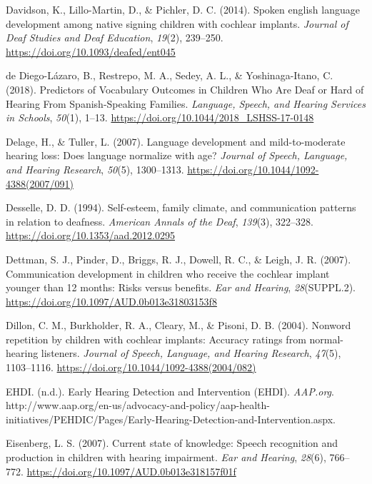 \documentclass[english,man]{apa6}
\begin{document}
\leavevmode\hypertarget{ref-davidson2014}{}%
Davidson, K., Lillo-Martin, D., \& Pichler, D. C. (2014). Spoken english language development among native signing children with cochlear implants. \emph{Journal of Deaf Studies and Deaf Education}, \emph{19}(2), 239--250. \url{https://doi.org/10.1093/deafed/ent045}

\leavevmode\hypertarget{ref-dediego-lazaro2018}{}%
de Diego-Lázaro, B., Restrepo, M. A., Sedey, A. L., \& Yoshinaga-Itano, C. (2018). Predictors of Vocabulary Outcomes in Children Who Are Deaf or Hard of Hearing From Spanish-Speaking Families. \emph{Language, Speech, and Hearing Services in Schools}, \emph{50}(1), 1--13. \url{https://doi.org/10.1044/2018_LSHSS-17-0148}

\leavevmode\hypertarget{ref-delage2007}{}%
Delage, H., \& Tuller, L. (2007). Language development and mild-to-moderate hearing loss: Does language normalize with age? \emph{Journal of Speech, Language, and Hearing Research}, \emph{50}(5), 1300--1313. \url{https://doi.org/10.1044/1092-4388(2007/091)}

\leavevmode\hypertarget{ref-desselle1994}{}%
Desselle, D. D. (1994). Self-esteem, family climate, and communication patterns in relation to deafness. \emph{American Annals of the Deaf}, \emph{139}(3), 322--328. \url{https://doi.org/10.1353/aad.2012.0295}

\leavevmode\hypertarget{ref-dettman2007}{}%
Dettman, S. J., Pinder, D., Briggs, R. J., Dowell, R. C., \& Leigh, J. R. (2007). Communication development in children who receive the cochlear implant younger than 12 months: Risks versus benefits. \emph{Ear and Hearing}, \emph{28}(SUPPL.2). \url{https://doi.org/10.1097/AUD.0b013e31803153f8}

\leavevmode\hypertarget{ref-dillon2004}{}%
Dillon, C. M., Burkholder, R. A., Cleary, M., \& Pisoni, D. B. (2004). Nonword repetition by children with cochlear implants: Accuracy ratings from normal-hearing listeners. \emph{Journal of Speech, Language, and Hearing Research}, \emph{47}(5), 1103--1116. \url{https://doi.org/10.1044/1092-4388(2004/082)}

\leavevmode\hypertarget{ref-ehdi}{}%
EHDI. (n.d.). Early Hearing Detection and Intervention (EHDI). \emph{AAP.org}. http://www.aap.org/en-us/advocacy-and-policy/aap-health-initiatives/PEHDIC/Pages/Early-Hearing-Detection-and-Intervention.aspx.

\leavevmode\hypertarget{ref-eisenberg2007}{}%
Eisenberg, L. S. (2007). Current state of knowledge: Speech recognition and production in children with hearing impairment. \emph{Ear and Hearing}, \emph{28}(6), 766--772. \url{https://doi.org/10.1097/AUD.0b013e318157f01f}
\end{document}

